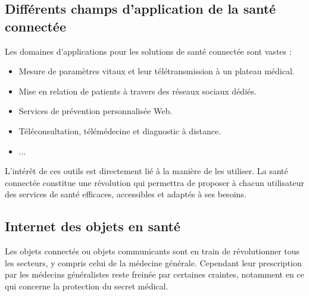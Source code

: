 \documentclass[12pt]{article}
\begin{document}
\subsection{Différents champs d’application de la santé connectée}
Les domaines d’applications pour les solutions de santé connectée sont vastes :
\begin{itemize}
	\item Mesure de paramètres vitaux et leur télétransmission à un plateau médical.
	\item Mise en relation de patients à travers des réseaux sociaux dédiés.
	\item Services de prévention personnalisée Web.
	\item Téléconsultation, télémédecine et diagnostic à distance.
	\item ...\\
\end{itemize}

L’intérêt de ces outils est directement lié à la manière de les utiliser. La santé connectée constitue une révolution qui permettra de proposer à chacun utilisateur des services de santé efficaces, accessibles et adaptés à ses besoins.

\subsection{Internet des objets en santé}
Les objets connectés ou objets communicants sont en train de révolutionner tous les secteurs, y compris celui de la médecine générale. Cependant leur prescription par les médecins généralistes reste freinée par certaines craintes, notamment en ce qui concerne la protection du secret médical.
\end{document}
